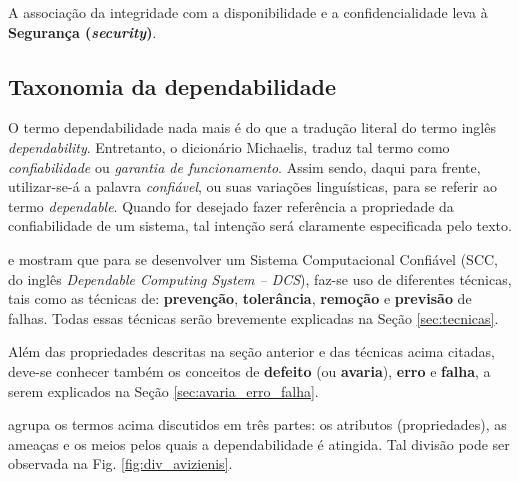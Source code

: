 A associação da integridade com a disponibilidade e a confidencialidade leva à
\textbf{Segurança (\textit{security})}.

\subsection{Taxonomia da dependabilidade}
O termo dependabilidade nada mais é do que a tradução literal do termo inglês
{\it dependability}. Entretanto, o dicionário Michaelis, traduz tal termo como
{\it confiabilidade} ou {\it garantia de funcionamento}. Assim sendo, daqui para
frente, utilizar-se-á a palavra {\it confiável}, ou suas variações linguísticas,
para se referir ao termo {\it dependable}. Quando for desejado fazer referência
a propriedade da confiabilidade de um sistema, tal intenção será claramente
especificada pelo texto.

 e  mostram que para se
desenvolver um Sistema Computacional Confiável (SCC, do inglês {\it Dependable
Computing System -- DCS}), faz-se uso de diferentes técnicas, tais como as
técnicas de: {\bf prevenção}, {\bf tolerância}, {\bf remoção} e {\bf previsão}
de falhas. Todas essas técnicas serão brevemente explicadas na Seção
\ref{sec:tecnicas}.

\begin{comment}
\begin{itemize}
    \item {\bf Técnicas de prevenção:} Como prevenir a ocorrência ou a introdução de
          falhas;
    \item {\bf Técnicas de tolerância:} Como oferecer um serviço ``correto'' na
          presença de falhas;
    \item {\bf Técnicas de remoção:} Como reduzir o número ou atenuar a gravidade
          das falhas;
    \item {\bf Técnicas de previsão:} Como estimar o número atual, a incidência
          futura e as consequências das prováveis falhas.
\end{itemize}
\end{comment}

Além das propriedades descritas na seção anterior e das técnicas acima citadas,
deve-se conhecer também os conceitos de {\bf defeito} (ou {\bf avaria}), {\bf
erro} e {\bf falha}, a serem explicados na Seção \ref{sec:avaria_erro_falha}.

 agrupa os termos acima discutidos em três partes: os
atributos (propriedades), as ameaças e os meios pelos quais a dependabilidade é
atingida. Tal divisão pode ser observada na Fig. \ref{fig:div_avizienis}.

